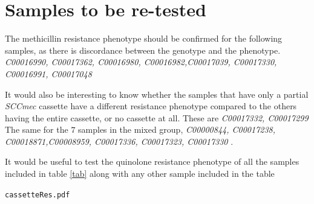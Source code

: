 \documentclass[12pt,a4paper]{article}
\begin{document}
\section{Samples to be re-tested}
The methicillin resistance phenotype should be confirmed for the following samples, as there is discordance between the genotype and the phenotype.
 \textit{ C00016990, C00017362, C00016980, C00016982,C00017039, C00017330, C00016991, C00017048 }
 
 It would also be interesting to know whether the samples that have only a partial \textit{SCCmec} cassette have a different resistance phenotype compared to the others having the entire cassette, or no cassette at all. These are  \textit{ C00017332, C00017299 }
The same for the $7$ samples in the mixed group,  \textit{ C00000844, C00017238, C00018871,C00008959, C00017336, C00017323, C00017330 }.


It would be useful to test the quinolone resistance phenotype of all the samples included in table \ref{tab} along with any other sample included in the table

\verb!cassetteRes.pdf!

{}


 
\end{document}
